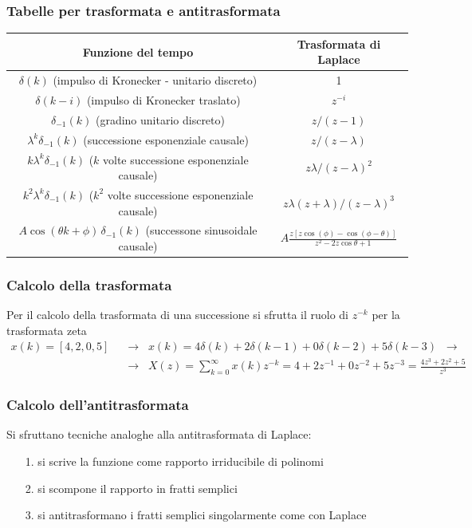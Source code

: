 \subsubsection*{Tabelle per trasformata e antitrasformata}
\begin{center}
	\begin{tabularx}{\textwidth}{ c | C }
		\textbf{Funzione del tempo} & \textbf{Trasformata di Laplace} \\
		\toprule
		\(\delta(k)\) (impulso di Kronecker - unitario discreto) & 1 \\
		\midrule
		\(\delta(k-i)\) (impulso di Kronecker traslato) & \(z^{-i}\) \\
		\midrule
		\(\delta_{-1}(k)\) (gradino unitario discreto) & \(z/(z-1)\) \\
		\midrule
		\(\lambda^k\delta_{-1}(k)\) (successione esponenziale causale) & \(z/(z-\lambda)\) \\
		\midrule
		\(k\lambda^k\delta_{-1}(k)\) (\(k\) volte successione esponenziale causale) & \(z\lambda/(z-\lambda)^2\) \\
		\midrule
		\(k^2\lambda^k\delta_{-1}(k)\) (\(k^2\) volte successione esponenziale causale) & \(z\lambda(z+\lambda)/(z-\lambda)^3\) \\
		\midrule
		\(A \cos(\theta k + \phi)\, \delta_{-1}(k)\) (successone sinusoidale causale) & \(A \frac{z\left[z\cos(\phi)-\cos(\phi-\theta)\right]}{z^2 - 2z\cos\theta + 1}\)
	\end{tabularx}
\end{center}

\newpage

\subsubsection*{Calcolo della trasformata}
Per il calcolo della trasformata di una successione si sfrutta il ruolo di \(z^{-k}\) per la trasformata zeta
\begin{align*}
	x(k) = [4,2,0,5] \;\;&\rightarrow\;\; x(k) = 4\delta(k) + 2\delta(k-1) + 0\delta(k-2) + 5\delta(k-3) \;\;\rightarrow \\
	&\rightarrow\;\; X(z) = \sum_{k=0}^{\infty} x(k)z^{-k} = 4 + 2z^{-1} + 0z^{-2} + 5z^{-3} = \frac{4z^3+2z^2+5}{z^3}
\end{align*}

\subsubsection*{Calcolo dell'antitrasformata}
Si sfruttano tecniche analoghe alla antitrasformata di Laplace:
\begin{itemize}
	\item[1.] si scrive la funzione come rapporto irriducibile di polinomi 
	\item[2.] si scompone il rapporto in fratti semplici
	\item[3.] si antitrasformano i fratti semplici singolarmente come con Laplace
\end{itemize}

